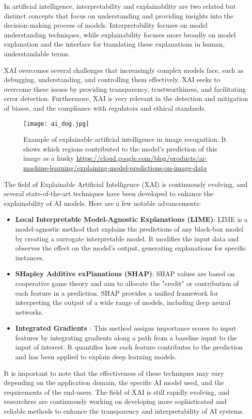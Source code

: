 In artificial intelligence, interpretability and explainability are two related but distinct concepts that focus on understanding and providing insights into the decision-making process of models. Interpretability focuses on model understanding techniques, while explainability focuses more broadly on model explanation and the interface for translating these explanations in human, understandable terms.

XAI overcomes several challenges that increasingly complex models face, such as debugging, understanding, and controlling them effectively. XAI seeks to overcome these issues by providing transparency, trustworthiness, and facilitating error detection. Furthermore, XAI is very relevant in the detection and mitigation of biases, and  the compliance with regulators and ethical standards.

\begin{figure}[!ht]
    \centering
    \texttt{[image: ai\_dog.jpg]}
    \caption{Example of explainable artificial intelligence in image recognition. It shows which regions contributed to the model's prediction of this image as a husky \url{https://cloud.google.com/blog/products/ai-machine-learning/explaining-model-predictions-on-image-data}}
    \label{fig:ai_dog}
\end{figure}

The field of Explainable Artificial Intelligence (XAI) is continuously evolving, and several state-of-the-art techniques have been developed to enhance the explainability of AI models. Here are a few notable advancements:

\begin{itemize}
    \item \textbf{Local Interpretable Model-Agnostic Explanations \cite{lime} (LIME)}: LIME is a model-agnostic method that explains the predictions of any black-box model by creating a surrogate interpretable model. It modifies the input data and observes the effect on the model's output, generating explanations for specific instances.
    \item \textbf{SHapley Additive exPlanations \cite{shap} (SHAP)}: SHAP values are based on cooperative game theory and aim to allocate the "credit" or contribution of each feature in a prediction. SHAP provides a unified framework for interpreting the output of a wide range of models, including deep neural networks.
    \item \textbf{Integrated Gradients \cite{integrated_gradients}}: This method assigns importance scores to input features by integrating gradients along a path from a baseline input to the input of interest. It quantifies how each feature contributes to the prediction and has been applied to explain deep learning models.
\end{itemize}

It is important to note that the effectiveness of these techniques may vary depending on the application domain, the specific AI model used, and the requirements of the end-users. The field of XAI is still rapidly evolving, and researchers are continuously working on developing more sophisticated and reliable methods to enhance the transparency and interpretability of AI systems.